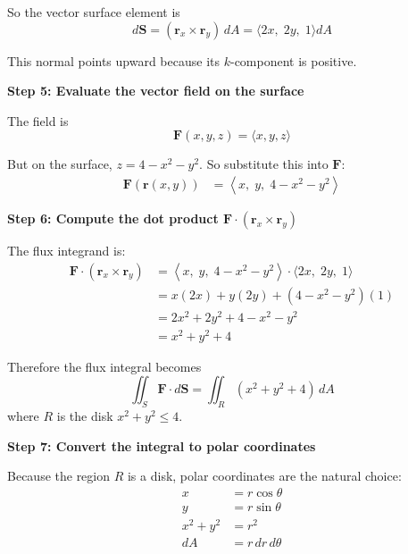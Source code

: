 \begin{examplebox}
    So the vector surface element is
    \begin{equation*}
        d\mathbf{S} = (\mathbf{r}_x \times \mathbf{r}_y)\, dA
        = \langle 2x,\; 2y,\; 1\rangle dA
    \end{equation*}

    This normal points upward because its $k$-component is positive.

    \textbf{Step 5: Evaluate the vector field on the surface}

    The field is
    \begin{equation*}
        \mathbf{F}(x,y,z)=\langle x,y,z\rangle
    \end{equation*}

    But on the surface, $z=4-x^2-y^2$. So substitute this into $\mathbf{F}$:
    \begin{align*}
        \mathbf{F}(\mathbf{r}(x,y))
         & = \left\langle x,\; y,\; 4-x^2-y^2 \right\rangle
    \end{align*}

    \textbf{Step 6: Compute the dot product $\mathbf{F}\cdot (\mathbf{r}_x \times \mathbf{r}_y)$}

    The flux integrand is:
    \begin{align*}
        \mathbf{F}\cdot (\mathbf{r}_x \times \mathbf{r}_y)
         & =
        \left\langle x,\; y,\; 4-x^2-y^2 \right\rangle
        \cdot
        \langle 2x,\; 2y,\; 1\rangle    \\
         & = x(2x)+y(2y)+(4-x^2-y^2)(1) \\
         & = 2x^2+2y^2+4-x^2-y^2        \\
         & = x^2+y^2+4
    \end{align*}

    Therefore the flux integral becomes
    \begin{equation*}
        \iint_S \mathbf{F}\cdot d\mathbf{S}
        =
        \iint_R (x^2+y^2+4)\, dA
    \end{equation*}
    where $R$ is the disk $x^2+y^2\le 4$.

    \textbf{Step 7: Convert the integral to polar coordinates}

    Because the region $R$ is a disk, polar coordinates are the natural choice:
    \begin{align*}
        x       & = r\cos\theta    \\
        y       & = r\sin\theta    \\
        x^2+y^2 & = r^2            \\
        dA      & = r\,dr\,d\theta
    \end{align*}


\end{examplebox}
